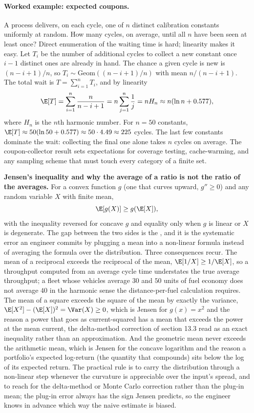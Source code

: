 \paragraph{Worked example: expected coupons.}
A process delivers, on each cycle, one of $n$ distinct calibration
constants uniformly at random. How many cycles, on average, until
all $n$ have been seen at least once? Direct enumeration of the
waiting time is hard; linearity makes it easy. Let $T_{i}$ be the
number of additional cycles to collect a new constant once $i - 1$
distinct ones are already in hand. The chance a given cycle is new
is $(n - i + 1)/n$, so $T_{i} \sim \mathrm{Geom}((n - i + 1)/n)$
with mean $n/(n - i + 1)$. The total wait is $T = \sum_{i=1}^{n}
T_{i}$, and by linearity
\[
\E[T] = \sum_{i=1}^{n} \frac{n}{n - i + 1}
= n \sum_{j=1}^{n} \frac{1}{j} = n H_{n}
\approx n(\ln n + 0.577),
\]
where $H_{n}$ is the $n$th harmonic number. For $n = 50$ constants,
$\E[T] \approx 50(\ln 50 + 0.577) \approx 50 \cdot 4.49 \approx 225$
cycles. The last few constants dominate the wait: collecting the
final one alone takes $n$ cycles on average. The coupon-collector
result sets expectations for coverage testing, cache-warming, and
any sampling scheme that must touch every category of a finite set.

\begin{mastery}
\textbf{Jensen's inequality and why the average of a ratio is not the
ratio of the averages.} For a convex function $g$ (one that curves
upward, $g'' \geq 0$) and any random variable $X$ with finite mean,
\[
\E[g(X)] \geq g(\E[X]),
\]
with the inequality reversed for concave $g$ and equality only when $g$
is linear or $X$ is degenerate. The gap between the two sides is the
, and it is the systematic error an engineer commits
by plugging a mean into a non-linear formula instead of averaging the
formula over the distribution. Three consequences recur. The mean of a
reciprocal exceeds the reciprocal of the mean, $\E[1/X] \geq 1/\E[X]$, so
a throughput computed from an average cycle time understates the true
average throughput; a fleet whose vehicles average $30$ and $50$ units of
fuel economy does not average $40$ in the harmonic sense the
distance-per-fuel calculation requires. The mean of a square exceeds the
square of the mean by exactly the variance, $\E[X^{2}] - (\E[X])^{2} =
\Var(X) \geq 0$, which is Jensen for $g(x) = x^{2}$ and the reason a
power that goes as current-squared has a mean that exceeds the power at
the mean current, the delta-method correction of section 13.3 read as an
exact inequality rather than an approximation. And the geometric mean
never exceeds the arithmetic mean, which is Jensen for the concave
logarithm and the reason a portfolio's expected log-return (the quantity
that compounds) sits below the log of its expected return. The practical
rule is to carry the distribution through a non-linear step whenever the
curvature is appreciable over the input's spread, and to reach for the
delta-method or Monte Carlo correction rather than the plug-in mean; the
plug-in error always has the sign Jensen predicts, so the engineer knows
in advance which way the naive estimate is biased.
\end{mastery}

